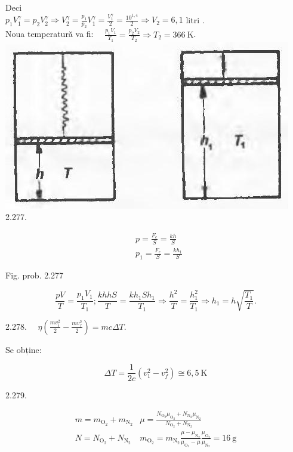\documentclass[10pt]{article}
\begin{document}
Deci\\
$p_{1} V_{1}^{\gamma}=p_{2} V_{2}^{\gamma} \Rightarrow V_{2}^{\gamma}=\frac{p_{1}}{p_{2}} V_{1}^{\gamma}=\frac{V_{1}^{\gamma}}{2}=\frac{10^{1,4}}{2} \Rightarrow V_{2}=6,1$ litri .\\
Noua temperatură va fi: $\quad \frac{p_{1} V_{1}}{T_{1}}=\frac{p_{2} V_{2}}{T_{2}} \Rightarrow T_{2}=366 \mathrm{~K}$.\\
\includegraphics[max width=\textwidth, center]{2025_07_01_5b3ff9fa0d508c8e9f17g-332}\\
2.277.

$$
\begin{aligned}
& p=\frac{F_{e}}{S}=\frac{k h}{S} \\
& p_{1}=\frac{F_{e}}{S}=\frac{k h_{1}}{S}
\end{aligned}
$$

Fig. prob. 2.277

$$
\frac{p V}{T}=\frac{p_{1} V_{1}}{T_{1}} ; \frac{k h h S}{T}=\frac{k h_{1} S h_{1}}{T_{1}} \Rightarrow \frac{h^{2}}{T}=\frac{h_{1}^{2}}{T_{1}} \Rightarrow h_{1}=h \sqrt{\frac{T_{1}}{T}} .
$$

2.278. $\quad \eta\left(\frac{m v_{i}^{2}}{2}-\frac{m v_{f}^{2}}{2}\right)=m c \Delta T$.

Se obține:

$$
\Delta T=\frac{1}{2 c}\left(v_{1}^{2}-v_{f}^{2}\right) \cong 6,5 \mathrm{~K}
$$

2.279.

$$
\begin{array}{ll}
m=m_{\mathrm{O}_{2}}+m_{\mathrm{N}_{2}} & \mu=\frac{N_{\mathrm{O}_{2}} \mu_{\mathrm{O}_{2}}+N_{\mathrm{N}_{2}} \mu_{\mathrm{N}_{2}}}{N_{\mathrm{O}_{2}}+N_{\mathrm{N}_{2}}} \\
N=N_{\mathrm{O}_{2}}+N_{\mathrm{N}_{2}} & m_{\mathrm{O}_{2}}=m_{\mathrm{N}_{2}} \frac{\mu-\mu_{\mathrm{N}_{2}}}{\mu_{\mathrm{O}_{2}}-\mu} \frac{\mu_{\mathrm{O}_{2}}}{\mu_{\mathrm{N}_{2}}}=16 \mathrm{~g}
\end{array}
$$
\end{document}
